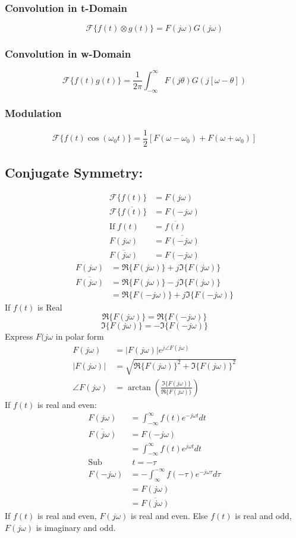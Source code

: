 \documentclass[a5paper]{article}
\newcommand{\For}{\mathcal{F}}
\begin{document}
	\subsubsection{Convolution in t-Domain}
	$$\For\{f(t)\otimes g(t)\}=F(j\omega)G(j\omega)$$
	\subsubsection{Convolution in w-Domain}
	$$\For\{f(t)g(t)\}=\frac{1}{2\pi}\int^{\infty}_{-\infty}F(j\theta)G(j[\omega-\theta])$$
	\subsubsection{Modulation}
	$$\For\{f(t)\cos{(\omega_{0}t)}\}=\frac{1}{2}[F(\omega-\omega_{0})+F(\omega+\omega_{0})]$$
	\subsection{Conjugate Symmetry:}
	\begin{align*}
		\For\{f(t)\}&=F(j\omega)\\
		\For\{\overline{f(t)}\}&=F(-j\omega)\\
		\text{If}\;f(t)&=\overline{f(t)}\\
		F(j\omega)&=\overline{F(-j\omega)}\\
		\overline{F(j\omega)}&=F(-j\omega)
	\end{align*}
	\begin{align*}
		F(j\omega)&=\Re\{F(j\omega)\}+j\Im\{F(j\omega)\}\\
		\overline{F(j\omega)}&=\Re\{F(j\omega)\}-j\Im\{F(j\omega)\}\\
		&=\Re\{F(-j\omega)\}+j\Im\{F(-j\omega)\}
	\end{align*}
	If $f(t)$ is Real
	$$\Re\{F(j\omega)\}=\Re\{F(-j\omega)\}$$
	$$\Im\{F(j\omega)\}=-\Im\{F(-j\omega)\}$$
	Express $F(j\omega$ in polar form
	\begin{align*}
		F(j\omega)&=|F(j\omega)|e^{j\angle  F(j\omega)}\\
		|F(j\omega)|&=\sqrt{\Re\{F(j\omega)\}^{2}+\Im\{F(j\omega)\}^{2}}\\
		\angle F(j\omega)&=\arctan{\left(\frac{\Im\{F(j\omega)\}}{\Re\{F(j\omega)\}}\right)}
	\end{align*}
	If $f(t)$ is real and even:
	\begin{align*}
		F(j\omega)&=\int^{\infty}_{-\infty}f(t)e^{-j\omega t}dt\\
		\overline{F(j\omega)}&=F(-j\omega)\\
		&=\int^{\infty}_{-\infty}f(t)e^{j\omega t}dt\\
		\text{Sub}&\;t=-\tau\\
		F(-j\omega)&=-\int^{-\infty}_{\infty}f(-\tau)e^{-j\omega\tau}d\tau\\
		&=F(j\omega)\\
		&=\overline{F(j\omega)}
	\end{align*}
	If $f(t)$ is real and even, $F(j\omega)$ is real and even. Else $f(t)$ is real and odd, $F(j\omega)$ is imaginary and odd.
\end{document}
